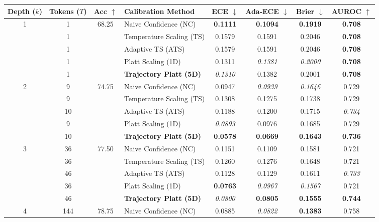 \begin{table}[t]
\setlength{\tabcolsep}{4pt}
\renewcommand{\arraystretch}{1.05}
\centering
\footnotesize
\begin{tabular}{ccclcccc}
\toprule
\textbf{Depth ($k$)} & \textbf{Tokens ($T$)} & \textbf{Acc} $\uparrow$ & \textbf{Calibration Method} & \textbf{ECE} $\downarrow$ & \textbf{Ada-ECE} $\downarrow$ & \textbf{Brier} $\downarrow$ & \textbf{AUROC} $\uparrow$ \\
\midrule
\multirow{5}{*}{1} & 1 & \multirow{5}{*}{68.25} & Naive Confidence (NC) & \textbf{0.1111} & \textbf{0.1094} & \textbf{0.1919} & \textbf{0.708} \\
 & 1 &  & Temperature Scaling (TS) & 0.1579 & 0.1591 & 0.2046 & \textbf{0.708} \\
 & 1 &  & Adaptive TS (ATS) & 0.1579 & 0.1591 & 0.2046 & \textbf{0.708} \\
 & 1 &  & Platt Scaling (1D) & 0.1311 & \textit{0.1381} & \textit{0.2000} & \textbf{0.708} \\
 & 1 &  & \textbf{Trajectory Platt (5D)} & \textit{0.1310} & 0.1382 & 0.2001 & \textbf{0.708} \\
\midrule
\multirow{5}{*}{2} & 9 & \multirow{5}{*}{74.75} & Naive Confidence (NC) & 0.0947 & \textit{0.0939} & \textit{0.1646} & 0.729 \\
 & 9 &  & Temperature Scaling (TS) & 0.1308 & 0.1275 & 0.1738 & 0.729 \\
 & 10 &  & Adaptive TS (ATS) & 0.1188 & 0.1200 & 0.1715 & \textit{0.734} \\
 & 9 &  & Platt Scaling (1D) & \textit{0.0893} & 0.0976 & 0.1685 & 0.729 \\
 & 10 &  & \textbf{Trajectory Platt (5D)} & \textbf{0.0578} & \textbf{0.0669} & \textbf{0.1643} & \textbf{0.736} \\
\midrule
\multirow{5}{*}{3} & 36 & \multirow{5}{*}{77.50} & Naive Confidence (NC) & 0.1151 & 0.1109 & 0.1581 & 0.721 \\
 & 36 &  & Temperature Scaling (TS) & 0.1260 & 0.1276 & 0.1648 & 0.721 \\
 & 46 &  & Adaptive TS (ATS) & 0.1128 & 0.1129 & 0.1611 & \textit{0.733} \\
 & 36 &  & Platt Scaling (1D) & \textbf{0.0763} & \textit{0.0967} & \textit{0.1567} & 0.721 \\
 & 46 &  & \textbf{Trajectory Platt (5D)} & \textit{0.0800} & \textbf{0.0805} & \textbf{0.1555} & \textbf{0.744} \\
\midrule
\multirow{5}{*}{4} & 144 & \multirow{5}{*}{78.75} & Naive Confidence (NC) & 0.0885 & \textit{0.0822} & \textbf{0.1383} & 0.758 \\

\end{tabular}
\end{table}
